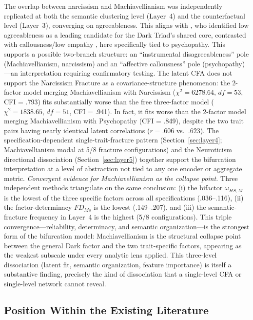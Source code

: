 \documentclass[11pt,twocolumn]{article}
\begin{document}
The overlap between narcissism and Machiavellianism was independently replicated at both the semantic clustering level (Layer~4) and the counterfactual level (Layer~3), converging on agreeableness. This aligns with \citet{vize2020}, who identified low agreeableness as a leading candidate for the Dark Triad's shared core, contrasted with callousness/low empathy \citep{paulhus2014}, here specifically tied to psychopathy. This supports a possible two-branch structure: an ``instrumental disagreeableness'' pole (Machiavellianism, narcissism) and an ``affective callousness'' pole (psychopathy)---an interpretation requiring confirmatory testing. The latent CFA does not support the Narcissism Fracture as a covariance-structure phenomenon: the 2-factor model merging Machiavellianism with Narcissism ($\chi^2 = 6278.64$, $df = 53$, CFI = .793) fits substantially worse than the free three-factor model ($\chi^2 = 1838.65$, $df = 51$, CFI = .941). In fact, it fits worse than the 2-factor model merging Machiavellianism with Psychopathy (CFI = .849), despite the two trait pairs having nearly identical latent correlations ($r = .606$ vs.\ $.623$). The specification-dependent single-trait-fracture pattern (Section~\ref{sec:layer4}; Machiavellianism modal at 5/8 fracture configurations) and the Neuroticism directional dissociation (Section~\ref{sec:layer5}) together support the bifurcation interpretation at a level of abstraction not tied to any one encoder or aggregate metric. \textit{Convergent evidence for Machiavellianism as the collapse point.} Three independent methods triangulate on the same conclusion: (i) the bifactor $\omega_{HS,M}$ is the lowest of the three specific factors across all specifications (.036--.116), (ii) the factor-determinacy $FD_{Ms}$ is the lowest (.149--.207), and (iii) the semantic-fracture frequency in Layer~4 is the highest (5/8 configurations). This triple convergence---reliability, determinacy, and semantic organization---is the strongest form of the bifurcation model: Machiavellianism is the structural collapse point between the general Dark factor and the two trait-specific factors, appearing as the weakest subscale under every analytic lens applied. This three-level dissociation (latent fit, semantic organization, feature importance) is itself a substantive finding, precisely the kind of dissociation that a single-level CFA or single-level network cannot reveal.

\subsection{Position Within the Existing Literature}
\end{document}
